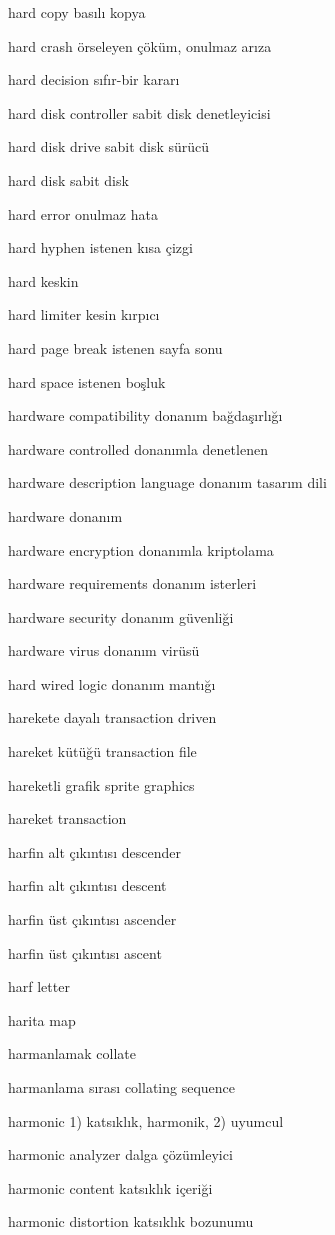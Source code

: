 \documentclass[12pt,fleqn]{article}\usepackage{../../common}
\begin{document}
hard copy basılı kopya

hard crash örseleyen çöküm, onulmaz arıza

hard decision sıfır-bir kararı

hard disk controller sabit disk denetleyicisi

hard disk drive sabit disk sürücü

hard disk sabit disk

hard error onulmaz hata

hard hyphen istenen kısa çizgi

hard keskin

hard limiter kesin kırpıcı

hard page break istenen sayfa sonu

hard space istenen boşluk

hardware compatibility donanım bağdaşırlığı

hardware controlled donanımla denetlenen

hardware description language donanım tasarım dili

hardware donanım

hardware encryption donanımla kriptolama

hardware requirements donanım isterleri

hardware security donanım güvenliği

hardware virus donanım virüsü

hard wired logic donanım mantığı

harekete dayalı transaction driven

hareket kütüğü transaction file

hareketli grafik sprite graphics

hareket transaction

harfin alt çıkıntısı descender

harfin alt çıkıntısı descent

harfin üst çıkıntısı ascender

harfin üst çıkıntısı ascent

harf letter

harita map

harmanlamak collate

harmanlama sırası collating sequence

harmonic 1) katsıklık, harmonik, 2) uyumcul

harmonic analyzer dalga çözümleyici

harmonic content katsıklık içeriği

harmonic distortion katsıklık bozunumu
\end{document}
